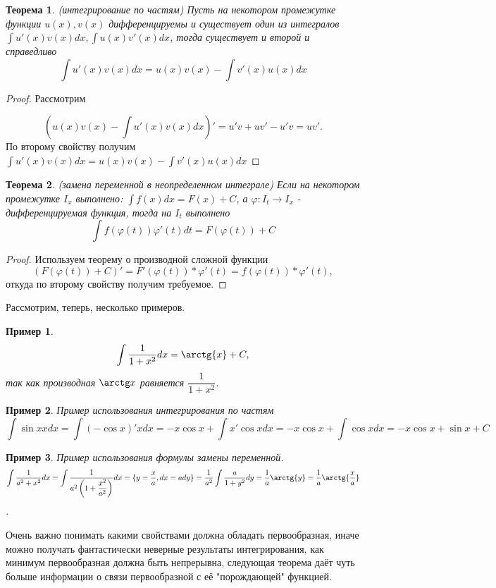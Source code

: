 \documentclass{book} %
\newtheorem{theorem}{Теорема}[chapter] %
\newtheorem{example}{Пример}[chapter] %
\theoremstyle{definition}
\theoremstyle{remark}
\begin{document}
		\begin{theorem} (интегрирование по частям)\newline
			Пусть на некотором промежутке функции $u(x), v(x)$ дифференцируемы и существует один из интегралов $\int u'(x) v(x) dx , \int u(x) v'(x) dx$, тогда существует и второй и справедливо
			$$
				\int u'(x) v(x) dx = u(x) v(x) - \int v'(x) u(x) dx
			$$
		\end{theorem}
		\begin{proof}
			Рассмотрим 
			
			$$
				\left(u(x) v(x) - \int u'(x) v(x) dx\right)' = u'v +uv' - u'v = uv'.
			$$
			По второму свойству получим $\int u'(x) v(x) dx = u(x) v(x) - \int v'(x) u(x) dx$
		\end{proof}
		\begin{theorem}
			(замена переменной в неопределенном интеграле)\newline
			Если на некотором промежутке $I_x$ выполнено: $\int f(x) dx = F(x) + C$, а $\varphi: I_t \to I_x$ - дифференцируемая функция, тогда на $I_t$ выполнено
			$$
				\int f(\varphi(t)) \varphi'(t) dt  = F(\varphi(t)) + C
			$$
		\end{theorem}
		\begin{proof}
			Используем теорему о производной сложной функции 
			$$
				\left(F(\varphi(t)) + C \right)' = F'(\varphi(t)) * \varphi'(t) = f(\varphi(t)) * \varphi'(t),
			$$
			откуда по второму свойству получим требуемое.
		\end{proof}
		Рассмотрим, теперь, несколько примеров.
		\begin{example}
			$$
				\int \dfrac{1}{1 + x^2} dx = \arctg{x} + C,
			$$
			так как производная $\arctg x$ равняется $\dfrac{1}{1+x^2}$.
		\end{example}
		\begin{example}
			Пример использования интегрирования по частям
			$$
			\int \sin{x} x dx = \int (- \cos{x})' x dx = -x \cos{x} + \int x' \cos{x} dx = -x \cos{x} + \int \cos{x} dx = -x \cos{x} + \sin{x} + C
			$$
		\end{example}
		\begin{example}
			Пример использования формулы замены переменной.
			$$
				\int \dfrac{1}{a^2 + x^2} dx = \int \limits \dfrac{1}{a^2\left(1 + \dfrac{x^2}{a^2}\right)}dx = \{y = \dfrac{x}{a}, dx  = a dy\} = \dfrac{1}{a^2} \int \dfrac{a}{1 + y^2} dy = \dfrac{1}{a} \arctg{y} = \dfrac{1}{a} \arctg{\dfrac{x}{a}}$$. 
			
		\end{example}
		Очень важно понимать какими свойствами должна обладать первообразная, иначе можно получать фантастически неверные результаты интегрирования, как минимум первообразная должна быть непрерывна, следующая теорема даёт чуть больше информации о связи первообразной с её "порождающей" функцией.
		
\end{document}
